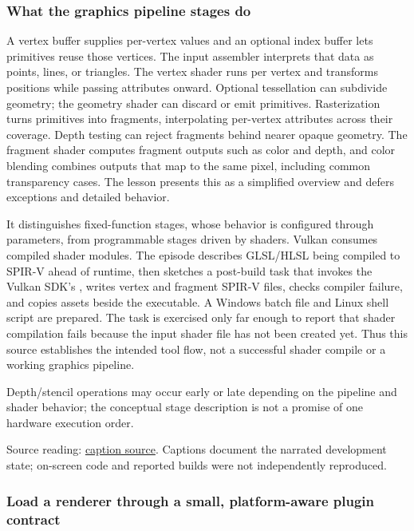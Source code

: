 \subsubsection{What the graphics pipeline stages do}\label{06-engine-ii-ch025-what-the-graphics-pipeline-stages-do}

\hypertarget{06-engine-ii-ch025-what-the-graphics-pipeline-stages-do}{}

A vertex buffer supplies per-vertex values and an optional index buffer lets primitives reuse those vertices. The input assembler interprets that data as points, lines, or triangles. The vertex shader runs per vertex and transforms positions while passing attributes onward. Optional tessellation can subdivide geometry; the geometry shader can discard or emit primitives. Rasterization turns primitives into fragments, interpolating per-vertex attributes across their coverage. Depth testing can reject fragments behind nearer opaque geometry. The fragment shader computes fragment outputs such as color and depth, and color blending combines outputs that map to the same pixel, including common transparency cases. The lesson presents this as a simplified overview and defers exceptions and detailed behavior.

It distinguishes fixed-function stages, whose behavior is configured through parameters, from programmable stages driven by shaders. Vulkan consumes compiled shader modules. The episode describes GLSL/HLSL being compiled to SPIR-V ahead of runtime, then sketches a post-build task that invokes the Vulkan SDK's , writes vertex and fragment SPIR-V files, checks compiler failure, and copies assets beside the executable. A Windows batch file and Linux shell script are prepared. The task is exercised only far enough to report that shader compilation fails because the input shader file has not been created yet. Thus this source establishes the intended tool flow, not a successful shader compile or a working graphics pipeline.

Depth/stencil operations may occur early or late depending on the pipeline and shader behavior; the conceptual stage description is not a promise of one hardware execution order.

Source reading: \href{https://www.youtube.com/watch?v=KanKG-vd9GA}{caption source}. Captions document the narrated development state; on-screen code and reported builds were not independently reproduced.

\subsubsection{Load a renderer through a small, platform-aware plugin contract}\label{06-engine-ii-ch025-load-a-renderer-through-a-small-platform-aware-plugin-contract}

